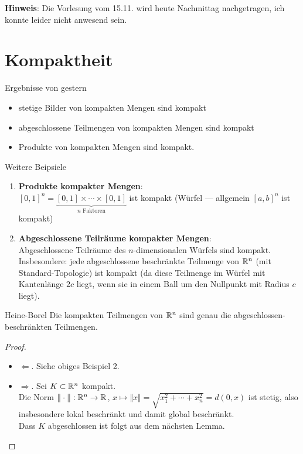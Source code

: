 \textbf{Hinweis}: Die Vorlesung vom 15.11. wird heute Nachmittag nachgetragen, ich konnte leider nicht anwesend sein.

\section{Kompaktheit}

\begin{bla}{Ergebnisse von gestern}
  \begin{itemize}
    \item stetige Bilder von kompakten Mengen sind kompakt
    \item abgeschlossene Teilmengen von kompakten Mengen sind kompakt
    \item Produkte von kompakten Mengen sind kompakt. 
  \end{itemize}
\end{bla}

\begin{example}{Weitere Beipsiele}
  \begin{enumerate}
    \item \textbf{Produkte kompakter Mengen}: \\
      $ [0,1]^n = \underbrace{[0,1] \times \cdots \times [0,1]}_{n \text{ Faktoren}} $ ist kompakt (Würfel --- allgemein $ [a,b]^n $ ist kompakt) 
    \item \textbf{Abgeschlossene Teilräume kompakter Mengen}: \\
      Abgeschlossene Teilräume des $ n $-dimensionalen Würfels sind kompakt. Insbesondere: jede abgeschlossene beschränkte Teilmenge von $ \mathbb{R}^n $ (mit Standard-Topologie) ist kompakt (da diese Teilmenge im Würfel mit Kantenlänge $ 2c $ liegt, wenn sie in einem Ball um den Nullpunkt mit Radius $ c $ liegt).
  \end{enumerate}
\end{example}

\begin{theorem}{Heine-Borel}
  Die kompakten Teilmengen von $ \mathbb{R}^n $ sind genau die abgeschlossen-beschränkten Teilmengen.
  \begin{proof}
    \begin{itemize}
      \item $ \Leftarrow $. Siehe obiges Beispiel 2.
      \item $ \Rightarrow $. Sei $ K \subset \mathbb{R}^n $ kompakt. \\
        Die Norm $ \Vert \cdot \Vert : \mathbb{R}^n \to \mathbb{R} $, $ x \mapsto \Vert x \Vert = \sqrt{x_1^2 + \cdots + x_n^2} = d(0,x) $ ist stetig, also insbesondere lokal beschränkt und damit global beschränkt. \\
        Dass $ K $ abgeschlossen ist folgt aus dem nächsten Lemma.
    \end{itemize}
  \end{proof}
\end{theorem}

